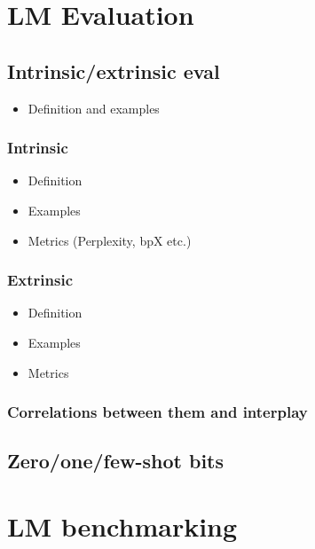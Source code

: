 \section{LM Evaluation}\label{lm-evaluation}

\subsection{Intrinsic/extrinsic eval}\label{intrinsicextrinsic-eval}

\begin{itemize}
\tightlist
\item
  Definition and examples
\end{itemize}

\subsubsection{Intrinsic}\label{intrinsic}

\begin{itemize}
\tightlist
\item
  Definition
\item
  Examples
\item
  Metrics (Perplexity, bpX etc.)
\end{itemize}

\subsubsection{Extrinsic}\label{extrinsic}

\begin{itemize}
\tightlist
\item
  Definition
\item
  Examples
\item
  Metrics
\end{itemize}

\subsubsection{Correlations between them and
interplay}\label{correlations-between-them-and-interplay}

\subsection{Zero/one/few-shot bits}\label{zeroonefew-shot-bits}

\section{LM benchmarking}\label{lm-benchmarking}

